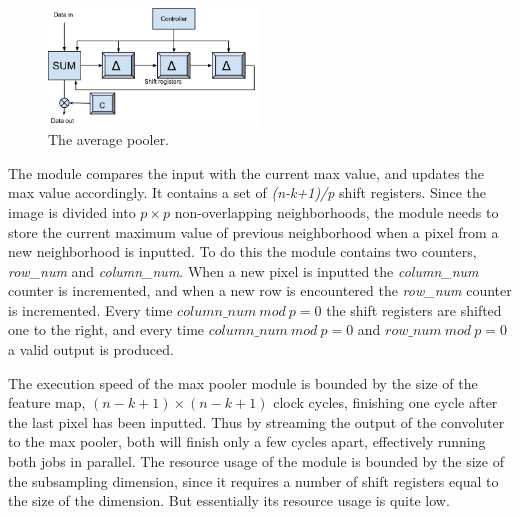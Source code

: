 \begin{figure}[h!]
  \centering
      \includegraphics[width=0.5\textwidth]{Figures/Method/submax}
  \caption{The average pooler.}
\end{figure}

The module compares the input with the current max value, and updates the max value accordingly. It contains a set of \textit{(n-k+1)/p} shift registers. Since the image is divided into $ p \times p $ non-overlapping neighborhoods, the module needs to store the current maximum value of previous neighborhood when a pixel from a new neighborhood is inputted. To do this the module contains two counters, \textit{row\_num} and \textit{column\_num}. When a new pixel is inputted the \textit{column\_num} counter is incremented, and when a new row is encountered the \textit{row\_num} counter is incremented. Every time $ column\_num~mod~p = 0 $ the shift registers are shifted one to the right, and every time $ column\_num~mod~p = 0 $ and $ row\_num~mod~p = 0 $ a valid output is produced. 



The execution speed of the max pooler module is bounded by the size of the feature map, $ (n-k+1) \times (n-k+1) $ clock cycles, finishing one cycle after the last pixel has been inputted. 
Thus by streaming the output of the convoluter to the max pooler, both will finish only a few cycles apart, effectively running both jobs in parallel. The resource usage of the module is bounded by the size of the subsampling dimension, since it requires a number of shift registers equal to the size of the dimension. But essentially its resource usage is quite low.  

